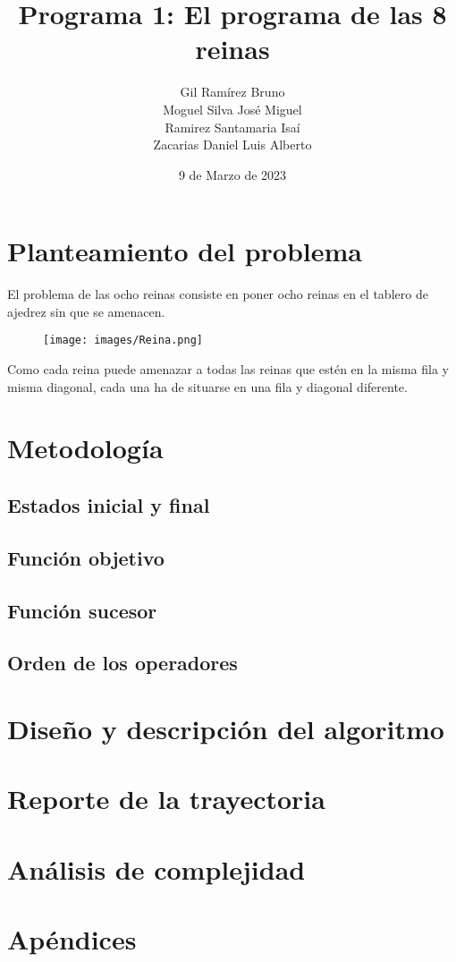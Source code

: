 \documentclass[11pt, letterpaper]{article}
\title{Programa 1: El programa de las 8 reinas}
\author{Gil Ramírez Bruno\\Moguel Silva José Miguel\\Ramirez Santamaria Isaí\\Zacarias Daniel Luis Alberto}
\date{9 de Marzo de 2023}
\begin{document}
\maketitle
\pagebreak
\tableofcontents
\pagebreak
\section{Planteamiento del problema}
El problema de las ocho reinas consiste en poner ocho reinas en el tablero de ajedrez sin que se amenacen.
\begin{figure}[!h]
    \centering
    \texttt{[image: images/Reina.png]}
\end{figure}

\smallskip
Como cada reina puede amenazar a todas las reinas que estén en la misma
fila y misma diagonal, cada una ha de situarse en una fila y diagonal diferente.
\section{Metodología}
\subsection{Estados inicial y final}
\subsection{Función objetivo}
\subsection{Función sucesor}
\subsection{Orden de los operadores}
\section{Diseño y descripción del algoritmo}
\section{Reporte de la trayectoria}
\section{Análisis de complejidad}
\section{Apéndices}
\end{document}
